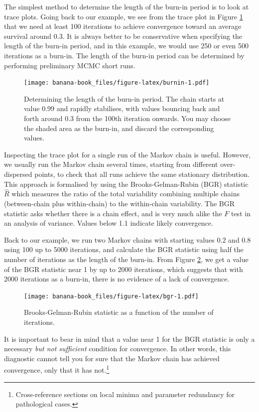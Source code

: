 \documentclass[
  12pt,
]{krantz}
\begin{document}
The simplest method to determine the length of the burn-in period is to look at trace plots. Going back to our example, we see from the trace plot in Figure \ref{fig:burnin} that we need at least 100 iterations to achieve convergence toward an average survival around 0.3. It is always better to be conservative when specifying the length of the burn-in period, and in this example, we would use 250 or even 500 iterations as a burn-in. The length of the burn-in period can be determined by performing preliminary MCMC short runs.

\begin{figure}
\centering
\texttt{[image: banana-book\_files/figure-latex/burnin-1.pdf]}
\caption{\label{fig:burnin}Determining the length of the burn-in period. The chain starts at value 0.99 and rapidly stabilises, with values bouncing back and forth around 0.3 from the 100th iteration onwards. You may choose the shaded area as the burn-in, and discard the corresponding values.}
\end{figure}

Inspecting the trace plot for a single run of the Markov chain is useful. However, we usually run the Markov chain several times, starting from different over-dispersed points, to check that all runs achieve the same stationary distribution. This approach is formalised by using the Brooks-Gelman-Rubin (BGR) statistic \(\hat{R}\) which measures the ratio of the total variability combining multiple chains (between-chain plus within-chain) to the within-chain variability. The BGR statistic asks whether there is a chain effect, and is very much alike the \(F\) test in an analysis of variance. Values below 1.1 indicate likely convergence.

Back to our example, we run two Markov chains with starting values 0.2 and 0.8 using 100 up to 5000 iterations, and calculate the BGR statistic using half the number of iterations as the length of the burn-in. From Figure \ref{fig:bgr}, we get a value of the BGR statistic near 1 by up to 2000 iterations, which suggests that with 2000 iterations as a burn-in, there is no evidence of a lack of convergence.

\begin{figure}
\centering
\texttt{[image: banana-book\_files/figure-latex/bgr-1.pdf]}
\caption{\label{fig:bgr}Brooks-Gelman-Rubin statistic as a function of the number of iterations.}
\end{figure}

It is important to bear in mind that a value near 1 for the BGR statistic is only a necessary \emph{but not sufficient} condition for convergence. In other words, this diagnostic cannot tell you for sure that the Markov chain has achieved convergence, only that it has not.\footnote{Cross-reference sections on local minima and parameter redundancy for pathological cases.}
\end{document}
